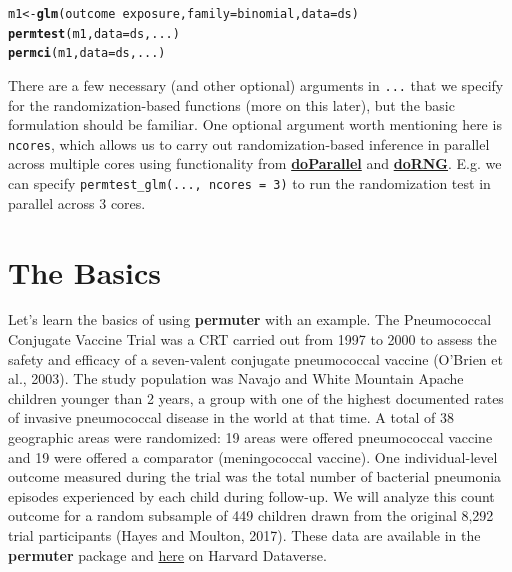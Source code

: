 \documentclass[12pt]{article}\usepackage[]{graphicx}\usepackage[]{color}
\makeatletter
\newcommand{\hlopt}[1]{\textcolor[rgb]{0,0,0}{#1}}%
\newcommand{\hlstd}[1]{\textcolor[rgb]{0.345,0.345,0.345}{#1}}%
\newcommand{\hlkwb}[1]{\textcolor[rgb]{0.69,0.353,0.396}{#1}}%
\newcommand{\hlkwc}[1]{\textcolor[rgb]{0.333,0.667,0.333}{#1}}%
\newcommand{\hlkwd}[1]{\textcolor[rgb]{0.737,0.353,0.396}{\textbf{#1}}}%
\newenvironment{kframe}{%
 \def\at@end@of@kframe{}%
 \ifinner\ifhmode%
  \def\at@end@of@kframe{\end{minipage}}%
  \begin{minipage}{\columnwidth}%
 \fi\fi%
 \def\FrameCommand##1{\hskip\@totalleftmargin \hskip-\fboxsep
 \colorbox{shadecolor}{##1}\hskip-\fboxsep
     \hskip-\linewidth \hskip-\@totalleftmargin \hskip\columnwidth}%
 \MakeFramed {\advance\hsize-\width
   \@totalleftmargin\z@ \linewidth\hsize
   \@setminipage}}%
 {\par\unskip\endMakeFramed%
 \at@end@of@kframe}
\newenvironment{knitrout}{}{} %
\makeatother
\begin{document}
\begin{knitrout}
\color{fgcolor}\begin{kframe}
\begin{alltt}
\hlstd{m1} \hlkwb{<-} \hlkwd{glm}\hlstd{(outcome} \hlopt{~} \hlstd{exposure,} \hlkwc{family} \hlstd{= binomial,} \hlkwc{data} \hlstd{= ds)}
\hlkwd{permtest}\hlstd{(m1,} \hlkwc{data} \hlstd{= ds, ...)}
\hlkwd{permci}\hlstd{(m1,} \hlkwc{data} \hlstd{= ds, ...)}
\end{alltt}
\end{kframe}
\end{knitrout}

There are a few necessary (and other optional) arguments in \texttt{...} that we specify for the randomization-based functions (more on this later), but the basic formulation should be familiar. One optional argument worth mentioning here is \texttt{ncores}, which allows us to carry out randomization-based inference in parallel across multiple cores using functionality from \href{https://cran.r-project.org/web/packages/doParallel/index.html}{\textbf{doParallel}} and \href{https://cran.r-project.org/web/packages/doRNG/index.html}{\textbf{doRNG}}. E.g. we can specify \texttt{permtest\_glm(..., ncores = 3)} to run the randomization test in parallel across 3 cores.

\section{The Basics}
Let's learn the basics of using \textbf{permuter} with an example. The Pneumococcal Conjugate Vaccine Trial was a CRT carried out from 1997 to 2000 to assess the safety and efficacy of a seven-valent conjugate pneumococcal vaccine (O'Brien et al., 2003). The study population was Navajo and White Mountain Apache children younger than 2 years, a group with one of the highest documented rates of invasive pneumococcal disease in the world at that time. A total of 38 geographic areas were randomized: 19 areas were offered pneumococcal vaccine and 19 were offered a comparator (meningococcal vaccine). One individual-level outcome measured during the trial was the total number of bacterial pneumonia episodes experienced by each child during follow-up. We will analyze this count outcome for a random subsample of 449 children drawn from the original 8,292 trial participants (Hayes and Moulton, 2017). These data are available in the \textbf{permuter} package and \href{https://dataverse.harvard.edu/dataverse/crt}{here} on Harvard Dataverse.
\end{document}

